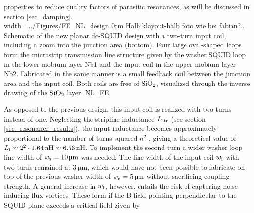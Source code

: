 properties to reduce quality factors of parasitic resonances, as will be discussed in section \ref{sec_damping}. \\

{width=\textwidth}
{../Figures/FE_NL_design}
{0cm}
{Halb klayout-halb foto wie bei fabian?.. Schematic of the new planar dc-SQUID design with a two-turn input coil, including a zoom into the junction area (bottom). Four large oval-shaped loops form the microstrip transmission line structure given by the washer SQUID loop in the lower niobium layer Nb1 and the input coil in the upper niobium layer Nb2. Fabricated in the same manner is a small feedback coil between the junction area and the input coil. Both coils are free of $\rm{SiO_2}$, visualized through the inverse drawing of the $\rm{SiO_2}$ layer.} 
{NL_FE}

As opposed to the previous design, this input coil is realized with two turns instead of one. Neglecting the stripline inductance $L_{\rm str}$ (see section \ref{sec_resonance_results}), the input inductance becomes approximately proportional to the number of turns squared $n^2$ \cite{Ketchen1981,Jaycox1981}, giving a theoretical value of $L_{\rm i}\approx2^{2}\cdot \qty{1.64}{\nano\henry}\approx\qty{6.56}{\nano\henry}$. To implement the second turn a wider washer loop line width of $w_{\rm s}=\qty{10}{\micro\meter}$ was needed. The line width of the input coil $w_{\rm i}$ with two turns remained at $\qty{3}{\micro\meter}$, which would have not been possible to fabricate on top of the previous washer width of $w_{\rm s}=\qty{5}{\micro\meter}$ without sacrificing coupling strength. A general increase in $w_{\rm i}$, however, entails the risk of capturing noise inducing flux vortices. These form if the B-field pointing perpendicular to the SQUID plane exceeds a critical field given by \cite{Kuit2008} 


